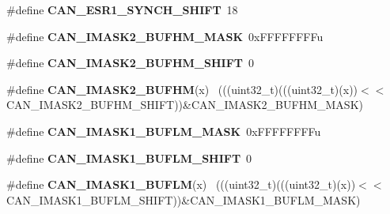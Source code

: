 \begin{DoxyCompactItemize}
\item 
\hypertarget{group___c_a_n___register___masks_ga2bd04d8052247b76f7bde4e6d936c0ac}{}\#define {\bfseries C\+A\+N\+\_\+\+E\+S\+R1\+\_\+\+S\+Y\+N\+C\+H\+\_\+\+S\+H\+I\+F\+T}~18\label{group___c_a_n___register___masks_ga2bd04d8052247b76f7bde4e6d936c0ac}

\item 
\hypertarget{group___c_a_n___register___masks_ga9a609dcb1bca8001d83d0c6e4606a454}{}\#define {\bfseries C\+A\+N\+\_\+\+I\+M\+A\+S\+K2\+\_\+\+B\+U\+F\+H\+M\+\_\+\+M\+A\+S\+K}~0x\+F\+F\+F\+F\+F\+F\+F\+Fu\label{group___c_a_n___register___masks_ga9a609dcb1bca8001d83d0c6e4606a454}

\item 
\hypertarget{group___c_a_n___register___masks_ga0d2a12288f44224a38a4d784903838bb}{}\#define {\bfseries C\+A\+N\+\_\+\+I\+M\+A\+S\+K2\+\_\+\+B\+U\+F\+H\+M\+\_\+\+S\+H\+I\+F\+T}~0\label{group___c_a_n___register___masks_ga0d2a12288f44224a38a4d784903838bb}

\item 
\hypertarget{group___c_a_n___register___masks_ga7842e9875d6cdb9f94beb0ce81cc5f95}{}\#define {\bfseries C\+A\+N\+\_\+\+I\+M\+A\+S\+K2\+\_\+\+B\+U\+F\+H\+M}(x)                                        ~(((uint32\+\_\+t)(((uint32\+\_\+t)(x))$<$$<$C\+A\+N\+\_\+\+I\+M\+A\+S\+K2\+\_\+\+B\+U\+F\+H\+M\+\_\+\+S\+H\+I\+F\+T))\&C\+A\+N\+\_\+\+I\+M\+A\+S\+K2\+\_\+\+B\+U\+F\+H\+M\+\_\+\+M\+A\+S\+K)\label{group___c_a_n___register___masks_ga7842e9875d6cdb9f94beb0ce81cc5f95}

\item 
\hypertarget{group___c_a_n___register___masks_ga1cb2f8a12349b014999ace58cd7600c6}{}\#define {\bfseries C\+A\+N\+\_\+\+I\+M\+A\+S\+K1\+\_\+\+B\+U\+F\+L\+M\+\_\+\+M\+A\+S\+K}~0x\+F\+F\+F\+F\+F\+F\+F\+Fu\label{group___c_a_n___register___masks_ga1cb2f8a12349b014999ace58cd7600c6}

\item 
\hypertarget{group___c_a_n___register___masks_gac50c90f8a89aa464399090953c634b8a}{}\#define {\bfseries C\+A\+N\+\_\+\+I\+M\+A\+S\+K1\+\_\+\+B\+U\+F\+L\+M\+\_\+\+S\+H\+I\+F\+T}~0\label{group___c_a_n___register___masks_gac50c90f8a89aa464399090953c634b8a}

\item 
\hypertarget{group___c_a_n___register___masks_gae725b30b1ffe087ecf0a1e36e9feb0b0}{}\#define {\bfseries C\+A\+N\+\_\+\+I\+M\+A\+S\+K1\+\_\+\+B\+U\+F\+L\+M}(x)                                        ~(((uint32\+\_\+t)(((uint32\+\_\+t)(x))$<$$<$C\+A\+N\+\_\+\+I\+M\+A\+S\+K1\+\_\+\+B\+U\+F\+L\+M\+\_\+\+S\+H\+I\+F\+T))\&C\+A\+N\+\_\+\+I\+M\+A\+S\+K1\+\_\+\+B\+U\+F\+L\+M\+\_\+\+M\+A\+S\+K)\label{group___c_a_n___register___masks_gae725b30b1ffe087ecf0a1e36e9feb0b0}


\end{DoxyCompactItemize}
